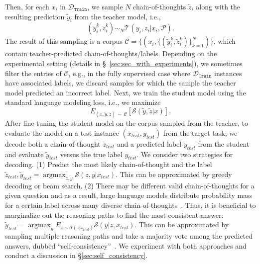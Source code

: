 \documentclass[11pt]{article}
\newcommand\jack[1]{{\color{orange}[#1]$_{Jack}$}}
\newcommand\harold[1]{{\color{gray}[#1]$_{harold}$}}
\begin{document}
Then, for each $x_i$ in $\mathcal{D}_{\texttt{Train}}$, we sample $N$ chain-of-thoughts $\tilde z_i$ along with the resulting prediction $\tilde y_i$ from the teacher model, i.e.,
$$
(\tilde y^k_i, \tilde z^k_i) \sim_N \mathcal{T}(y_i, z_i | x_i, \mathcal{P}).
$$
The result of this sampling is a corpus $\mathcal{C} = \{ (x_i, \{(\tilde y^k_i, \tilde z^k_i)\}^N_{k=1} ) \}$, which contain teacher-predicted chain-of-thoughts/labels. Depending on the experimental setting (details in \S~\ref{sec:sec_with_experiments}), we sometimes filter the entries of $\mathcal{C}$, e.g., in the fully supervised case where $\mathcal{D}_{\texttt{Train}}$ instances have associated labels, we discard samples for which the sample the teacher model predicted an incorrect label.
Next, we train the student model using the standard language modeling loss, i.e., we maximize
$$
E_{(x, \tilde{y}, \tilde{z}) \, \sim \, \mathcal{C}}[
\mathcal{S}(\tilde{y}, \tilde{z} | x)].
$$
After fine-tuning the student model on the corpus sampled from the teacher, to evaluate the model on a test instance $(x_{test}, y_{test})$ from the target task, we decode both a chain-of-thought $\tilde z_{test}$ and a predicted label $\tilde y_{test}$ from the student
and evaluate $\tilde y_{test}$ versus the true label $y_{test}$.
We consider two strategies for decoding. %
(1) Predict the most likely chain-of-thought and the label $\tilde z_{test}, \tilde y_{test} = \operatorname*{argmax}_{z, y} \mathcal{S}(z, y | x_{test}).$ This can be approximated by greedy decoding or beam search. (2) There may be different valid chain-of-thoughts for a given question and as a result, large language models distribute probability mass for a certain label across many diverse chain-of-thoughts~\citep{wang2022self}. Thus, it is beneficial to marginalize out the reasoning paths to find the most consistent answer: $\tilde y_{test} = \operatorname*{argmax}_{y} E_{z \sim \mathcal{S}(z| x_{test})} \mathcal{S}(y | z, x_{test}).$
This can be approximated by sampling multiple reasoning paths and take a majority vote among the predicted answers, dubbed ``self-consistency''~\citep{wang2022self}. We experiment with both approaches and conduct a discussion in \S \ref{sec:self_consistency}.
\end{document}
